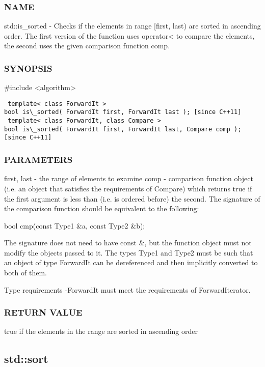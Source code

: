 \subsubsection{NAME}
std::is\_sorted - Checks if the elements in range [first, last) are sorted in ascending order. The first version of the function uses operator< to compare the elements, the second uses the given comparison function comp.

\subsubsection{SYNOPSIS}
\#include <algorithm>

\begin{lstlisting}
 template< class ForwardIt >
bool is\_sorted( ForwardIt first, ForwardIt last ); [since C++11]
 template< class ForwardIt, class Compare >
bool is\_sorted( ForwardIt first, ForwardIt last, Compare comp ); [since C++11]
\end{lstlisting}

\subsubsection{PARAMETERS}
first, last - the range of elements to examine
comp - comparison function object (i.e. an object that satisfies the requirements of Compare) which returns true if the first argument is less than (i.e. is ordered before) the second.
The signature of the comparison function should be equivalent to the following:

 bool cmp(const Type1 \&a, const Type2 \&b);

The signature does not need to have const \&, but the function object must not modify the objects passed to it.
The types Type1 and Type2 must be such that an object of type ForwardIt can be dereferenced and then implicitly converted to both of them.

 Type requirements
 -ForwardIt must meet the requirements of ForwardIterator.

\subsubsection{RETURN VALUE}
true if the elements in the range are sorted in ascending order



\subsection{std::sort}

